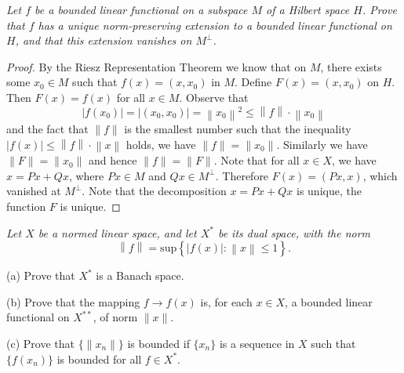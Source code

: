 \begin{problem}\em
Let $f$ be a bounded linear functional on a subspace $M$ of a Hilbert space $H$. Prove that $f$ has a unique norm-preserving extension to a bounded linear functional on $H$, and that this extension vanishes on $M^\perp$.
\end{problem}
\begin{proof}
By the Riesz Representation Theorem we know that on $M$, there exists some $x_0\in M$ such that $f(x)=(x,x_0)$ in $M$. Define $F(x)=(x,x_0)$ on $H$. Then $F(x)=f(x)$ for all $x\in M$. Observe that 
$$
\left| f\left( x_0 \right) \right|=\left| \left( x_0,x_0 \right) \right|=\left\| x_0 \right\| ^2\le \left\| f \right\| \cdot \left\| x_0 \right\| 
$$
and the fact that $\|f\|$ is the smallest number such that the inequality $\left| f\left( x \right) \right|\le \left\| f \right\| \cdot \left\| x \right\| $ holds, we have $\|f\|=\|x_0\|$. Similarly we have $\|F\|=\|x_0\|$ and hence $\|f\|=\|F\|$. Note that for all $x\in X$, we have $x=Px+Qx$, where $Px\in M$ and $Qx\in M^\perp$. Therefore $F(x)=(Px,x)$, which vanished at $M^\perp$. Note that the decomposition $x=Px+Qx$ is unique, the function $F$ is unique.
\end{proof}
\begin{problem}\em
Let $X$ be a normed linear space, and let $X^*$ be its dual space, with the norm 
$$
\left\| f \right\| =\mathrm{sup}\left\{ \left| f\left( x \right) \right|:\left\| x \right\| \le 1 \right\} .
$$\par
(a) Prove that $X^*$ is a Banach space.\par
(b) Prove that the mapping $f\to f(x)$ is, for each $x\in X$, a bounded linear functional on $X^{**}$, of norm $\|x\|$.\par
(c) Prove that $\{\|x_n\|\}$ is bounded if $\{x_n\}$ is a sequence in $X$ such that $\{f(x_n)\}$ is bounded for all $f\in X^*$.
\end{problem}

